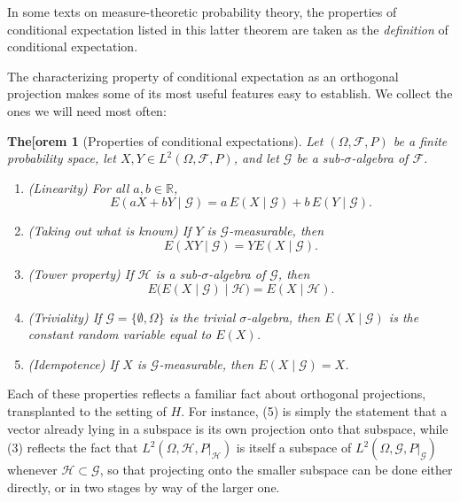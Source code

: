 \documentclass[11pt]{book}
\newtheorem{thm}{The[orem}[section]
\theoremstyle{definition}
\numberwithin{equation}{section}
\begin{document}
In some texts on measure-theoretic probability theory, the properties of conditional expectation listed in this latter theorem are taken as the \textit{definition} of conditional expectation.

The characterizing property of conditional expectation as an orthogonal projection makes some of its most useful features easy to establish. We collect the ones we will need most often:

\begin{thm}[Properties of conditional expectations]\label{thm:cond-exp-properties}
	Let $(\Omega, \mathcal{F}, P)$ be a finite probability space, let $X, Y \in L^2(\Omega, \mathcal{F}, P)$, and let $\mathcal{G}$ be a sub-$\sigma$-algebra of $\mathcal{F}$.
	\begin{enumerate}
		\item (\textit{Linearity}) For all $a,b \in \mathbb{R}$,
		      \[
			      E(aX + bY \mid \mathcal{G}) = a\,E(X\mid \mathcal{G}) + b\,E(Y \mid \mathcal{G}).
		      \]
		\item (\textit{Taking out what is known}) If $Y$ is $\mathcal{G}$-measurable, then
		      \[
			      E(XY \mid \mathcal{G}) = Y E(X \mid \mathcal{G}).
		      \]
		\item (\textit{Tower property}) If $\mathcal{H}$ is a sub-$\sigma$-algebra of $\mathcal{G}$, then
		      \[
			      E\big(E(X\mid \mathcal{G}) \mid \mathcal{H}\big) = E(X \mid \mathcal{H}).
		      \]
		\item (\textit{Triviality}) If $\mathcal{G} = \{\emptyset, \Omega\}$ is the trivial $\sigma$-algebra, then $E(X \mid \mathcal{G})$ is the constant random variable equal to $E(X)$.
		\item (\textit{Idempotence}) If $X$ is $\mathcal{G}$-measurable, then $E(X \mid \mathcal{G}) = X$.
	\end{enumerate}
\end{thm}

Each of these properties reflects a familiar fact about orthogonal projections, transplanted to the setting of $H$. For instance, (5) is simply the statement that a vector already lying in a subspace is its own projection onto that subspace, while (3) reflects the fact that $L^2(\Omega,\mathcal{H},P|_{\mathcal{H}})$ is itself a subspace of $L^2(\Omega,\mathcal{G},P|_{\mathcal{G}})$ whenever $\mathcal{H} \subset \mathcal{G}$, so that projecting onto the smaller subspace can be done either directly, or in two stages by way of the larger one.
\end{document}
